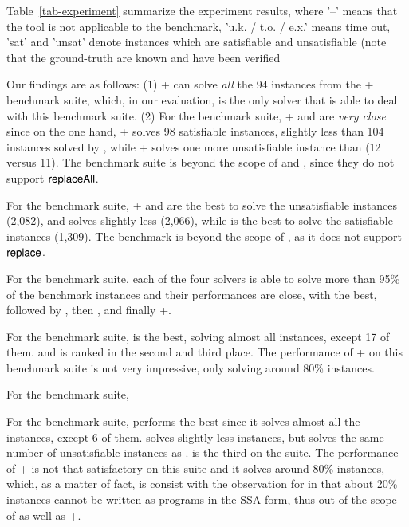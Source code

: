 Table~\ref{tab-experiment} summarize the experiment results, where '--' means that the tool is not applicable to the benchmark, 'u.k. / t.o. / e.x.' means time out,  'sat' and 'unsat' denote instances which are satisfiable and unsatisfiable (note that the ground-truth are known and have been verified   

Our findings are as follows: (1) {\ostrich}+ can solve  \emph{all} the 94 instances from the {\transducerbench}+ benchmark suite, which, in our evaluation, is the only solver that is able to deal with this benchmark suite. (2) For the {\slogbenchra} benchmark suite, {\ostrich}+ and {\cvc} are \emph{very close} since on the one hand, {\ostrich}+ solves 98 satisfiable instances, slightly less than 104 instances solved by {\cvc}, while {\ostrich}+ solves one more unsatisfiable instance than {\cvc} (12 versus 11). The {\slogbenchra} benchmark suite is beyond the scope of {\zthree} and {\zthreetrau}, since they do not support $\mathsf{replaceAll}$.

For the {\slogbenchr} benchmark suite, {\ostrich}+ and {\cvc} are the best to solve the unsatisfiable instances (2,082), and {\zthree} solves slightly less (2,066),  
while {\cvc} is the best to solve the satisfiable instances (1,309). The {\slogbenchr} benchmark is beyond the scope of {\zthreetrau}, as it does not support $\mathsf{replace}$.

For the {\pyextdbench} benchmark suite, each of the four solvers is able to solve more than 95\% of the benchmark instances and their performances are close, with {\zthreetrau} the best, followed by {\cvc}, then {\zthree}, and finally {\ostrich}+.  

For the {\pyexztbench} benchmark suite, {\zthreetrau} is the best, solving almost all instances, except 17 of them. {\cvc} and {\zthree} is ranked in the second and third place. The performance of {\ostrich}+ on this benchmark suite is not very impressive, only solving around 80\% instances.

For the {\pyexzzbench} benchmark suite, 

For the {\kaluzabench} benchmark suite, {\cvc} performs the best since it solves almost all the instances, except 6 of them. {\zthreetrau} solves slightly less instances, but solves the same number of unsatisfiable instances as {\cvc}. {\zthree} is the third on the {\kaluzabench} suite. The performance of {\ostrich}+ is not that satisfactory on this suite and it  solves  around 80\%  instances, which, as a matter of fact, is consist with the observation for {\ostrich} in \cite{CHL+19} that about 20\% {\kaluzabench} instances cannot be written as programs in the SSA form, thus out of the scope of {\ostrich} as well as {\ostrich}+.

